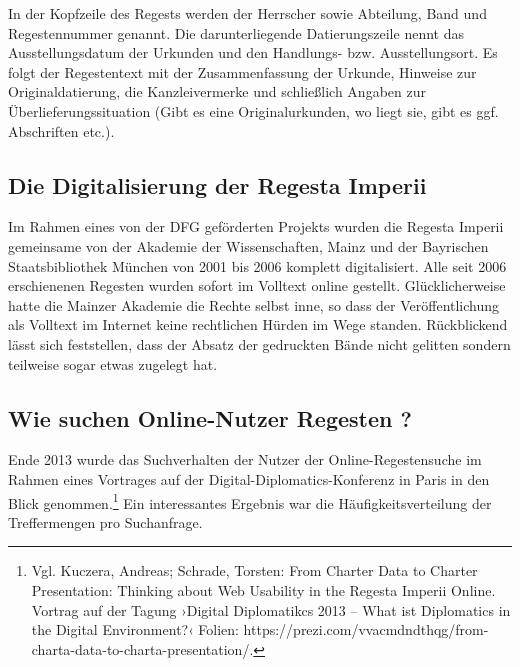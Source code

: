 \documentclass[12pt,ngerman,]{article}
\begin{document}
In der Kopfzeile des Regests werden der Herrscher sowie Abteilung, Band
und Regestennummer genannt. Die darunterliegende Datierungszeile nennt
das Ausstellungsdatum der Urkunden und den Handlungs- bzw.
Ausstellungsort. Es folgt der Regestentext mit der Zusammenfassung der
Urkunde, Hinweise zur Originaldatierung, die Kanzleivermerke und
schließlich Angaben zur Überlieferungssituation (Gibt es eine
Originalurkunden, wo liegt sie, gibt es ggf. Abschriften etc.).

\subsection{Die Digitalisierung der Regesta
Imperii}\label{die-digitalisierung-der-regesta-imperii}

Im Rahmen eines von der DFG geförderten Projekts wurden die Regesta
Imperii gemeinsame von der Akademie der Wissenschaften, Mainz und der
Bayrischen Staatsbibliothek München von 2001 bis 2006 komplett
digitalisiert. Alle seit 2006 erschienenen Regesten wurden sofort im
Volltext online gestellt. Glücklicherweise hatte die Mainzer Akademie
die Rechte selbst inne, so dass der Veröffentlichung als Volltext im
Internet keine rechtlichen Hürden im Wege standen. Rückblickend lässt
sich feststellen, dass der Absatz der gedruckten Bände nicht gelitten
sondern teilweise sogar etwas zugelegt hat.

\subsection{Wie suchen Online-Nutzer Regesten
?}\label{wie-suchen-online-nutzer-regesten}

Ende 2013 wurde das Suchverhalten der Nutzer der Online-Regestensuche im
Rahmen eines Vortrages auf der Digital-Diplomatics-Konferenz in Paris in
den Blick genommen.\footnote{Vgl. Kuczera, Andreas; Schrade, Torsten:
  From Charter Data to Charter Presentation: Thinking about Web
  Usability in the Regesta Imperii Online. Vortrag auf der Tagung
  ›Digital Diplomatikcs 2013 -- What ist Diplomatics in the Digital
  Environment?‹ Folien:
  https://prezi.com/vvacmdndthqg/from-charta-data-to-charta-presentation/.}
Ein interessantes Ergebnis war die Häufigkeitsverteilung der
Treffermengen pro Suchanfrage.
\end{document}
